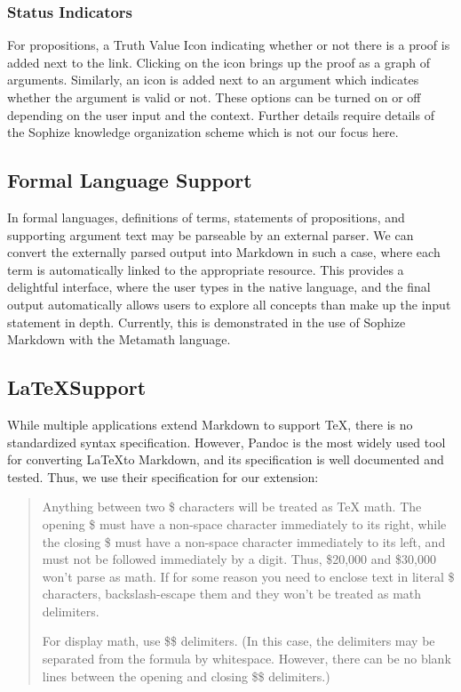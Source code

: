 \documentclass[a4paper]{article}
\begin{document}
\subsubsection{Status Indicators}

For propositions, a Truth Value Icon indicating whether or not there is a proof is added next to the link. Clicking on the icon brings up the proof as a graph of arguments. Similarly, an icon is added next to an argument which indicates whether the argument is valid or not. These options can be turned on or off depending on the user input and the context. Further details require details of the Sophize knowledge organization scheme which is not our focus here.

\subsection{Formal Language Support}

In formal languages, definitions of terms, statements of propositions, and supporting argument text may be parseable by an external parser. We can convert the externally parsed output into Markdown in such a case, where each term is automatically linked to the appropriate resource. This provides a delightful interface, where the user types in the native language, and the final output automatically allows users to explore all concepts than make up the input statement in depth. Currently, this is demonstrated in the use of Sophize Markdown with the Metamath language.

\subsection{\LaTeX\space Support}

While multiple applications extend Markdown to support TeX, there is no standardized syntax specification. However, Pandoc is the most widely used tool for converting \LaTeX\space to Markdown, and its specification is well documented and tested. Thus, we use their specification for our extension\cite{pandoc}:

\blockquote{Anything between two \$ characters will be treated as TeX math. The opening \$ must have a non-space character immediately to its right, while the closing \$ must have a non-space character immediately to its left, and must not be followed immediately by a digit. Thus, \$20,000 and \$30,000 won’t parse as math. If for some reason you need to enclose text in literal \$ characters, backslash-escape them and they won’t be treated as math delimiters.

For display math, use \$\$ delimiters. (In this case, the delimiters may be separated from the formula by whitespace. However, there can be no blank lines between the opening and closing \$\$ delimiters.)}
\end{document}
